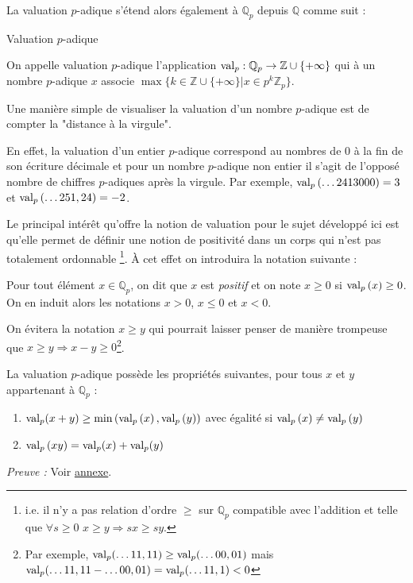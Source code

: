 La valuation $p$-adique s'étend alors également à $\mathbb{Q}_p$ depuis $\mathbb{Q}$ comme suit :
\begin{definition} Valuation $p$-adique
  
	On appelle valuation $p$-adique l'application $\text{val}_p: \mathbb{Q}_p \to \mathbb{Z}\cup \{+\infty\}  $ qui à un nombre $p$-adique $x$ associe $\max \{k \in \mathbb{Z}\cup \{+\infty\}| x\in p^k \mathbb{Z}_p\}$. 
\end{definition}
Une manière simple de visualiser la valuation d'un nombre $p$-adique est de compter la "distance à la virgule".

En effet, la valuation d'un entier $p$-adique correspond au nombres de $0$ à la fin de son écriture décimale et pour un nombre $p$-adique non entier il s'agit de l'opposé nombre de chiffres $p$-adiques après la virgule. Par exemple, $\text{val}_p\left( \ldots 2413000 \right) = 3$ et $\text{val}_p\left( \ldots 251,24 \right) = -2$.       

Le principal intérêt qu'offre la notion de valuation pour le sujet développé ici est qu'elle permet de définir une notion de positivité dans un corps qui n'est pas totalement ordonnable \footnote{i.e. il n'y a pas relation d'ordre $\ge $ sur $\mathbb{Q}_{p}$ compatible avec l'addition et telle que $\forall s\ge 0$ $x\ge y \Rightarrow sx\ge sy$.}. À cet effet on introduira la notation suivante :
\begin{notation}
	Pour tout élément $x \in \mathbb{Q}_{p} $, on dit que $x$ est \hypertarget{positif}{\textit{positif}} et on note $x\ge 0$ si $\text{val}_p\left(x\right)\ge 0$. On en induit alors les notations $x> 0$, $x\le 0$ et $x<0$.  
\end{notation}

        On évitera la notation $x\ge y$ qui pourrait laisser penser de manière trompeuse que $x\ge y \Rightarrow x-y\ge 0$\footnote{Par exemple, $\text{val}_p(\ldots11,11) \ge \text{val}_p(\ldots00,01) $ mais $\text{val}_p(\ldots11,11 - \ldots00,01) = \text{val}_p( \ldots 11,1) < 0$}.

\begin{propriete}
	La valuation $p$-adique possède les propriétés suivantes, pour tous $x$ et $y$ appartenant à $\mathbb{Q}_{p} $ :   
	\begin{enumerate}
		\label{propval} 
		\item $\text{val}_p(x+y) \ge \min\left( \text{val}_p\left( x \right), \text{val}_p\left( y \right)  \right) $ avec égalité si $\text{val}_p\left(x\right) \neq \text{val}_p\left(y\right)$
		\item $\text{val}_p\left( xy \right) = \text{val}_p (x) + \text{val}_p( y)$ 
	\end{enumerate}
\end{propriete}
\textit{Preuve :} Voir \hyperlink{propvalpreuve}{annexe}.   

